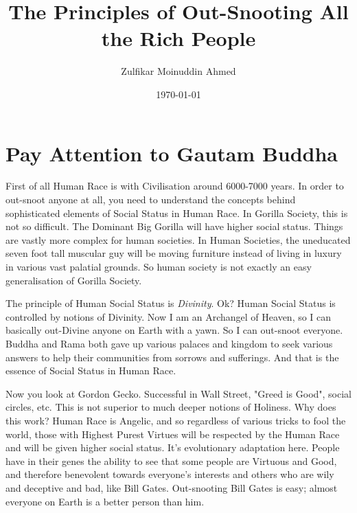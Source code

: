 \documentclass{amsart}
\title{The Principles of Out-Snooting All the Rich People}
\author{Zulfikar Moinuddin Ahmed}
\date{\today}
\begin{document}
\maketitle

\section{Pay Attention to Gautam Buddha}

First of all Human Race is with Civilisation around 6000-7000 years.  In order to out-snoot anyone at all, you need to understand the concepts behind sophisticated elements of Social Status in Human Race.  In Gorilla Society, this is not so difficult.  The Dominant Big Gorilla will have higher social status.  Things are vastly more complex for human societies.  In Human Societies, the uneducated seven foot tall muscular guy will be moving furniture instead of living in luxury in various vast palatial grounds.  So human society is not exactly an easy generalisation of Gorilla Society.

The principle of Human Social Status is {\em Divinity}.  Ok?  Human Social Status is controlled by notions of Divinity.  Now I am an Archangel of Heaven, so I can basically out-Divine anyone on Earth with a yawn.  So I can out-snoot everyone.  Buddha and Rama both gave up various palaces and kingdom to seek various answers to help their communities from sorrows and sufferings.  And that is the essence of Social Status in Human Race.  

Now you look at Gordon Gecko.  Successful in Wall Street, "Greed is Good", social circles, etc. This is not superior to much deeper notions of Holiness.  Why does this work?  Human Race is Angelic, and so regardless of various tricks to fool the world, those with Highest Purest Virtues will be respected by the Human Race and will be given higher social status.  It's evolutionary adaptation here.  People have in their genes the ability to see that some people are Virtuous and Good, and therefore benevolent towards everyone's interests and others who are wily and deceptive and bad, like Bill Gates.  Out-snooting Bill Gates is easy; almost everyone on Earth is a better person than him.
\end{document}
